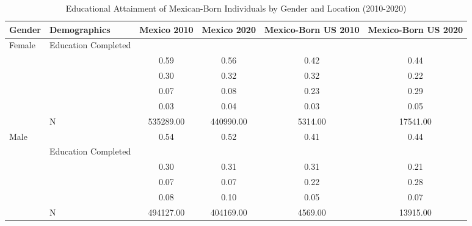 \begin{table}[ht]
\centering
\caption{Educational Attainment of Mexican-Born Individuals by Gender and Location (2010-2020)} 
\begingroup\small
\begin{tabular}{l>{\raggedright\arraybackslash}p{3.2cm}|cccc}
  \hline
Gender & Demographics & Mexico 2010 & Mexico 2020 & Mexico-Born US 2010 & Mexico-Born US 2020 \\ 
  \hline
Female & Education Completed &  &  &  &  \\ 
   & \multicolumn{1}{>{\raggedleft\arraybackslash}p{3.2cm}|}{\makebox[3.2cm][r]{Less than Primary }} & 0.59 & 0.56 & 0.42 & 0.44 \\ 
   & \multicolumn{1}{>{\raggedleft\arraybackslash}p{1.7cm}|}{\makebox[1.7cm][r]{Primary }} & 0.30 & 0.32 & 0.32 & 0.22 \\ 
   & \multicolumn{1}{>{\raggedleft\arraybackslash}p{2cm}|}{\makebox[2cm][r]{Secondary }} & 0.07 & 0.08 & 0.23 & 0.29 \\ 
   & \multicolumn{1}{>{\raggedleft\arraybackslash}p{2cm}|}{\makebox[2cm][r]{University }} & 0.03 & 0.04 & 0.03 & 0.05 \\ 
   & N & 535289.00 & 440990.00 & 5314.00 & 17541.00 \\ 
  Male & \multicolumn{1}{>{\raggedleft\arraybackslash}p{3.2cm}|}{\makebox[3.2cm][r]{Less than Primary }} & 0.54 & 0.52 & 0.41 & 0.44 \\ 
   & Education Completed &  &  &  &  \\ 
   & \multicolumn{1}{>{\raggedleft\arraybackslash}p{1.7cm}|}{\makebox[1.7cm][r]{Primary }} & 0.30 & 0.31 & 0.31 & 0.21 \\ 
   & \multicolumn{1}{>{\raggedleft\arraybackslash}p{2cm}|}{\makebox[2cm][r]{Secondary }} & 0.07 & 0.07 & 0.22 & 0.28 \\ 
   & \multicolumn{1}{>{\raggedleft\arraybackslash}p{2cm}|}{\makebox[2cm][r]{University }} & 0.08 & 0.10 & 0.05 & 0.07 \\ 
   & N & 494127.00 & 404169.00 & 4569.00 & 13915.00 \\ 
   \hline
\end{tabular}
\endgroup
\end{table}
